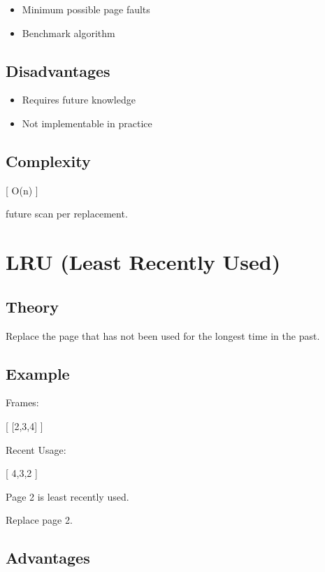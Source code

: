 \begin{itemize}
\item Minimum possible page faults
\item Benchmark algorithm
\end{itemize}

\subsection{Disadvantages}

\begin{itemize}
\item Requires future knowledge
\item Not implementable in practice
\end{itemize}

\subsection{Complexity}

[
O(n)
]

future scan per replacement.

\section{LRU (Least Recently Used)}

\subsection{Theory}

Replace the page that has not been used for the longest time in the past.

\subsection{Example}

Frames:

[
[2,3,4]
]

Recent Usage:

[
4,3,2
]

Page 2 is least recently used.

Replace page 2.

\subsection{Advantages}

